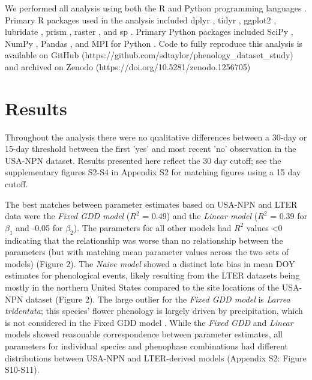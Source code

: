 \documentclass[fleqn,12pt,lineno]{article}
\begin{document}
We performed all analysis using both the R and Python programming languages \citep{rcitation, python}. Primary R packages used in the analysis included dplyr \citep{dplyr}, tidyr \citep{tidyr}, ggplot2 \citep{ggplot2}, lubridate \citep{lubridate}, prism \citep{prismR}, raster \citep{rasterR}, and sp \citep{sp1}. Primary Python packages included SciPy \citep{scipy}, NumPy \citep{numpy}, Pandas \citep{pandas}, and MPI for Python \citep{mpi4py}. Code to fully reproduce this analysis is available on GitHub  (https://github.com/sdtaylor/phenology\_dataset\_study) and archived on Zenodo  (https://doi.org/10.5281/zenodo.1256705)

\section*{Results}

Throughout the analysis there were no qualitative differences between a 30-day or 15-day threshold between the first 'yes' and most recent 'no' observation in the USA-NPN dataset. Results presented here reflect the 30 day cutoff; see the supplementary figures S2-S4 in Appendix S2 for matching figures using a 15 day cutoff. 

The best matches between parameter estimates based on USA-NPN and LTER data were the \textit{Fixed GDD model} ($R^2$ = 0.49) and the \textit{Linear model} ($R^2$ = 0.39 for $\beta_{1}$ and -0.05 for $\beta_{2}$). The parameters for all other models had $R^2$ values \textless 0 indicating that the relationship was worse than no relationship between the parameters (but with matching mean parameter values across the two sets of models) (Figure 2). The \textit{Naive model} showed a distinct late bias in mean DOY estimates for phenological events, likely resulting from the LTER datasets being mostly in the northern United States compared to the site locations of the USA-NPN dataset (Figure 2). The large outlier for the \textit{Fixed GDD model} is \textit{Larrea tridentata}; this species' flower phenology is largely driven by precipitation, which is not considered in the Fixed GDD model \citep{beatley1974}. While the \textit{Fixed GDD} and \textit{Linear} models showed reasonable correspondence between parameter estimates, all parameters for individual species and phenophase combinations had different distributions between USA-NPN and LTER-derived models (Appendix S2: Figure S10-S11).
\end{document}

